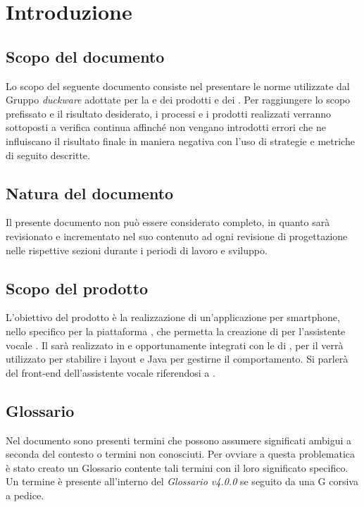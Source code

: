 \clearpage
\section{Introduzione}
\label{sec:intro}
\subsection{Scopo del documento}
Lo scopo del seguente documento consiste nel presentare le norme utilizzate dal Gruppo \emph{duckware} adottate per la  e  dei prodotti e dei . Per raggiungere lo scopo prefissato e il risultato desiderato, i processi e i prodotti realizzati verranno sottoposti a verifica continua affinché non vengano introdotti errori che ne influiscano il risultato finale in maniera negativa con l'uso di strategie e metriche di seguito descritte.
\subsection{Natura del documento}
Il presente documento non può essere considerato completo, in quanto sarà revisionato e incrementato nel suo contenuto ad ogni revisione di progettazione nelle rispettive sezioni durante i periodi di lavoro e sviluppo.
\subsection{Scopo del prodotto}
L'obiettivo del prodotto è la realizzazione di un'applicazione per smartphone, nello specifico per la piattaforma , che permetta la creazione di  per l'assistente vocale  .\newline
Il  sarà realizzato in  e  opportunamente integrati con le  di , per il  verrà utilizzato  per stabilire i layout e Java per gestirne il comportamento. Si parlerà del front-end dell'assistente vocale riferendosi a .
\subsection{Glossario}
Nel documento sono presenti termini che possono assumere significati ambigui a seconda del contesto o termini non conosciuti. Per ovviare a questa problematica è stato creato un Glossario contente tali termini con il loro significato specifico. Un termine è presente all'interno del \emph{Glossario v4.0.0} se seguito da una G corsiva a pedice.
